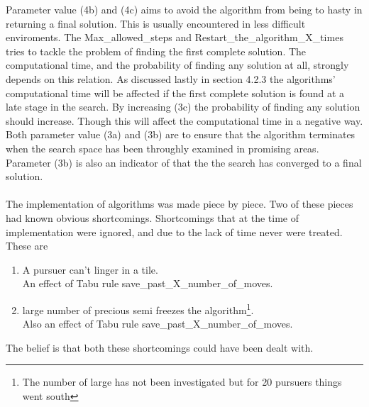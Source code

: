 Parameter value (4b) and (4c) aims to avoid the algorithm from being to hasty in returning a final solution. This is usually encountered in less difficult enviroments. The Max\_allowed\_steps and Restart\_the\_algorithm\_X\_times tries to tackle the problem of finding the first complete solution. The computational time, and the probability of finding any solution at all, strongly depends on this relation. As discussed lastly in section 4.2.3 the algorithms' computational time will be affected if the first complete solution is found at a late stage in the search. By increasing (3c) the probability of finding any solution should increase. Though this will affect the computational time in a negative way. Both parameter value (3a) and (3b) are to ensure that the algorithm terminates when the search space has been throughly examined in promising areas.
Parameter (3b) is also an indicator of that the the search has converged to a final solution.\\
\\
The implementation of algorithms was made piece by piece. Two of these pieces had known obvious shortcomings. Shortcomings that at the time of implementation were ignored, and due to the lack of time never were treated. These are\\
\begin{enumerate}
\item{} A pursuer can’t linger in a tile. \vspace{0,1cm}\\
 An effect of Tabu rule save\_past\_X\_number\_of\_moves.
\item{} large number of precious semi freezes the algorithm\footnote{ The number of large has not been investigated but for 20 pursuers things went south }. \vspace{0,1cm}\\
Also an effect of Tabu rule save\_past\_X\_number\_of\_moves.
\end{enumerate} 
The belief is that both these shortcomings could have been dealt with.

